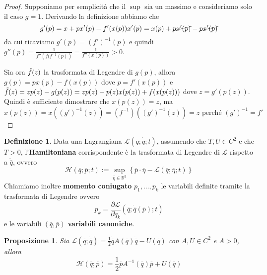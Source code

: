 \documentclass{book}
\theoremstyle{plain}
\theoremstyle{plain}
\theoremstyle{plain}
\theoremstyle{plain}
\theoremstyle{plain}
\newtheorem{prop}{Proposizione}[chapter]
\theoremstyle{definition}
\newtheorem{defi}{Definizione}[chapter]
\theoremstyle{remark}
\theoremstyle{definition}
\begin{document}
\begin{proof}
    Supponiamo per semplicità che il $\sup$ sia un massimo e consideriamo solo il caso $g=1$. Derivando la definizione abbiamo che
    \begin{displaymath}
        g'(p)=x+px'(p)-f'(x(p))x'(p)=x(p)+\cancel{px'(p)}-\cancel{px'(p)}
    \end{displaymath}
    da cui ricaviamo $g'(p)=\left(f'\right)^{-1}(p)$ e quindi $g''(p)=\frac{1}{f''\left( f(f^{-1}(p)\right)}=\frac{1}{f''\left(x(p)\right)}>0$.

    \noindent Sia ora $\Tilde{f}(z)$ la trasformata di Legendre di $g(p)$, allora $g(p)=px(p)-f(x(p))$ dove $p=f'(x(p))$ e $\Tilde{f}(z)=zp(z)-g(p(z))=zp(z)-p(z)x(p(z))+f(x(p(z)))$ dove $z=g'(p(z))$. Quindi è sufficiente dimostrare che $x(p(z))=z$, ma
    \begin{displaymath}
        x(p(z))=x\left((g')^{-1}(z)\right)=(f^{-1})\left((g')^{-1}(z)\right)=z \text{ perché $(g')^{-1}=f'$}
    \end{displaymath}
\end{proof}

\begin{defi}
    Data una Lagrangiana $\mathcal{L}(\overline{q};\Dot{\overline{q}};t)$, assumendo che $T, U \in C^2$ e che $T>0$, l'\textbf{Hamiltoniana} corrispondente è la trasformata di Legendre di $\mathcal{L}$ rispetto a $\dot{\overline{q}}$, ovvero
    \begin{displaymath}
    \boxed{
        \mathcal{H}(\overline{q};\overline{p};t):=\sup_{\overline{\eta}\in\mathbb{R}^g}\left\{\overline{p}\cdot\overline{\eta}-\mathcal{L}(\overline{q};\overline{\eta};t)\right\}
        }
    \end{displaymath}
    Chiamiamo inoltre \textbf{momento coniugato} $p_1,\ldots,p_k$ le variabili definite tramite la trasformata di Legendre ovvero
    \begin{displaymath}
        \boxed{
        p_k=\frac{\partial\mathcal{L}}{\partial\dot{q}_k}(\overline{q};\dot{\overline{q}}(\overline{p});t)
        }
    \end{displaymath}
    e le variabili $(\overline{q}, \overline{p})$ \textbf{variabili canoniche}.
\end{defi}

\begin{prop}
    Sia $\mathcal{L}(\overline{q};\dot{\overline{q}})=\frac{1}{2}\dot{\overline{q}}A(\overline{q})\dot{\overline{q}}-U(\overline{q})$ con $A, U\in C^2$ e $A>0$, allora
    \begin{displaymath}
    \boxed{
        \mathcal{H}(\overline{q};\overline{p})=\frac{1}{2}\overline{p}A^{-1}(\overline{q})\overline{p}+U(\overline{q})
        }
    \end{displaymath}
\end{prop}
\end{document}
